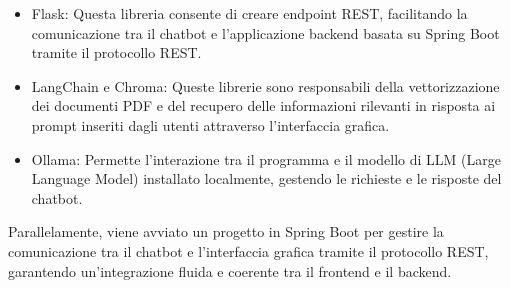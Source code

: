 \documentclass[a4paper,twoside,12pt]{toptesi}
\begin{document}
\begin{itemize}
	\item Flask: Questa libreria consente di creare endpoint REST, facilitando la comunicazione tra il chatbot e l'applicazione backend basata su Spring Boot tramite il protocollo REST.
	\item LangChain e Chroma: Queste librerie sono responsabili della vettorizzazione dei documenti PDF e del recupero delle informazioni rilevanti in risposta ai prompt inseriti dagli utenti attraverso l'interfaccia grafica.
	\item Ollama: Permette l'interazione tra il programma e il modello di LLM (Large Language Model) installato localmente, gestendo le richieste e le risposte del chatbot.
\end{itemize}

Parallelamente, viene avviato un progetto in Spring Boot per gestire la comunicazione tra il chatbot e l'interfaccia grafica tramite il protocollo REST, garantendo un'integrazione fluida e coerente tra il frontend e il backend.
\end{document}
